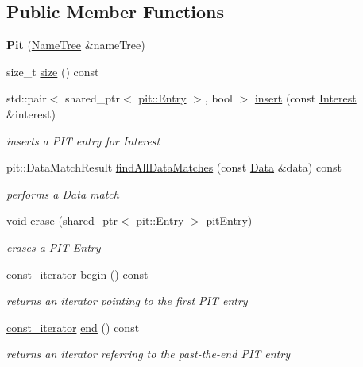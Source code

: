 \subsection*{Public Member Functions}
\begin{DoxyCompactItemize}
\item 
{\bfseries Pit} (\hyperlink{classnfd_1_1NameTree}{Name\+Tree} \&name\+Tree)\hypertarget{classnfd_1_1Pit_a4728ab9d405a83e9bf3adcab54974b39}{}\label{classnfd_1_1Pit_a4728ab9d405a83e9bf3adcab54974b39}

\item 
size\+\_\+t \hyperlink{classnfd_1_1Pit_a4636a9b04512ed27e84c5bd450525415}{size} () const
\item 
std\+::pair$<$ shared\+\_\+ptr$<$ \hyperlink{classnfd_1_1pit_1_1Entry}{pit\+::\+Entry} $>$, bool $>$ \hyperlink{classnfd_1_1Pit_a3c9f6eee3327efe06fcfc5c24d1d4659}{insert} (const \hyperlink{classndn_1_1Interest}{Interest} \&interest)
\begin{DoxyCompactList}\small\item\em inserts a P\+IT entry for Interest \end{DoxyCompactList}\item 
pit\+::\+Data\+Match\+Result \hyperlink{classnfd_1_1Pit_aebcf239dd3612937c87fbee3d8be783e}{find\+All\+Data\+Matches} (const \hyperlink{classndn_1_1Data}{Data} \&data) const
\begin{DoxyCompactList}\small\item\em performs a Data match \end{DoxyCompactList}\item 
void \hyperlink{classnfd_1_1Pit_a8ec33aa2fe7eb4c72103352e67fea698}{erase} (shared\+\_\+ptr$<$ \hyperlink{classnfd_1_1pit_1_1Entry}{pit\+::\+Entry} $>$ pit\+Entry)\hypertarget{classnfd_1_1Pit_a8ec33aa2fe7eb4c72103352e67fea698}{}\label{classnfd_1_1Pit_a8ec33aa2fe7eb4c72103352e67fea698}

\begin{DoxyCompactList}\small\item\em erases a P\+IT Entry \end{DoxyCompactList}\item 
\hyperlink{classnfd_1_1Pit_1_1const__iterator}{const\+\_\+iterator} \hyperlink{classnfd_1_1Pit_a3f6de8825f00d3d6afae85ac437e1255}{begin} () const
\begin{DoxyCompactList}\small\item\em returns an iterator pointing to the first P\+IT entry \end{DoxyCompactList}\item 
\hyperlink{classnfd_1_1Pit_1_1const__iterator}{const\+\_\+iterator} \hyperlink{classnfd_1_1Pit_a516cf9e804e946b784e8669585e41b66}{end} () const
\begin{DoxyCompactList}\small\item\em returns an iterator referring to the past-\/the-\/end P\+IT entry \end{DoxyCompactList}\end{DoxyCompactItemize}

